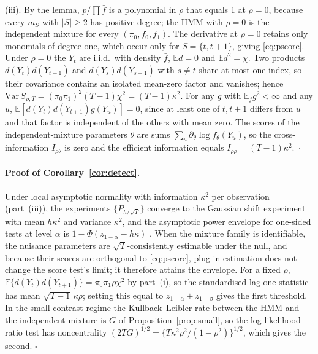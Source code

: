 \documentclass[12pt,letterpaper]{article}
\newcommand{\E}{\mathbb{E}}
\theoremstyle{plain}
\theoremstyle{remark}
\begin{document}
(iii). By the lemma, $p/\prod\bar f$ is a polynomial in $\rho$ that equals 1 at $\rho=0$, because every $m_S$ with $|S|\ge2$ has positive degree; the HMM with $\rho=0$ is the independent mixture for every $(\pi_0,f_0,f_1)$. The derivative at $\rho=0$ retains only monomials of degree one, which occur only for $S=\{t,t+1\}$, giving \eqref{eq:pscore}. Under $\rho=0$ the $Y_t$ are i.i.d.\ with density $\bar f$, $\E d=0$ and $\E d^2=\chi$. Two products $d(Y_t)d(Y_{t+1})$ and $d(Y_s)d(Y_{s+1})$ with $s\neq t$ share at most one index, so their covariance contains an isolated mean-zero factor and vanishes; hence $\mathrm{Var}\,S_{\rho,T}=(\pi_0\pi_1)^2(T-1)\chi^2=(T-1)\kappa^2$. For any $g$ with $\E_{\bar f}g^2<\infty$ and any $u$, $\E[d(Y_t)d(Y_{t+1})g(Y_u)]=0$, since at least one of $t,t+1$ differs from $u$ and that factor is independent of the others with mean zero. The scores of the independent-mixture parameters $\theta$ are sums $\sum_u\partial_\theta\log\bar f_\theta(Y_u)$, so the cross-information $I_{\rho\theta}$ is zero and the efficient information equals $I_{\rho\rho}=(T-1)\kappa^2$. $\square$

\paragraph{Proof of Corollary~\ref{cor:detect}.} Under local asymptotic normality with information $\kappa^2$ per observation (part~(iii)), the experiments $\{P_{h/\sqrt T}\}$ converge to the Gaussian shift experiment with mean $h\kappa^2$ and variance $\kappa^2$, and the asymptotic power envelope for one-sided tests at level $\alpha$ is $1-\Phi(z_{1-\alpha}-h\kappa)$ \citep[Ch.~15]{vandervaart1998}. When the mixture family is identifiable, the nuisance parameters are $\sqrt T$-consistently estimable under the null, and because their scores are orthogonal to \eqref{eq:pscore}, plug-in estimation does not change the score test's limit; it therefore attains the envelope. For a fixed $\rho$, $\E\{d(Y_t)d(Y_{t+1})\}=\pi_0\pi_1\rho\chi^2$ by part~(i), so the standardised lag-one statistic has mean $\sqrt{T-1}\,\kappa\rho$; setting this equal to $z_{1-\alpha}+z_{1-\beta}$ gives the first threshold. In the small-contrast regime the Kullback--Leibler rate between the HMM and the independent mixture is $G$ of Proposition~\ref{prop:small}, so the log-likelihood-ratio test has noncentrality $(2TG)^{1/2}=\{T\kappa^2\rho^2/(1-\rho^2)\}^{1/2}$, which gives the second. $\square$
\end{document}
